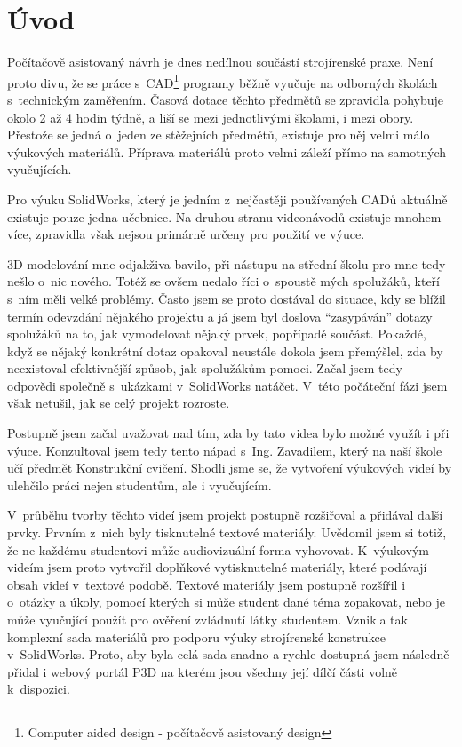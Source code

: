 \chapter*{Úvod}
Počítačově asistovaný návrh je dnes nedílnou součástí strojírenské praxe.
Není proto divu, že se práce s~CAD\footnote{Computer aided design - počítačově asistovaný design} programy běžně vyučuje na odborných školách s~technickým zaměřením.
Časová dotace těchto předmětů se zpravidla pohybuje okolo 2 až 4 hodin týdně, a liší se mezi jednotlivými školami, i mezi obory.
Přestože se jedná o~jeden ze stěžejních předmětů, existuje pro něj velmi málo výukových materiálů.
Příprava materiálů proto velmi záleží přímo na samotných vyučujících.

Pro výuku SolidWorks, který je jedním z~nejčastěji používaných CADů aktuálně existuje pouze jedna učebnice.
Na druhou stranu videonávodů existuje mnohem více, zpravidla však nejsou primárně určeny pro použití ve výuce.

3D modelování mne odjakživa bavilo, při nástupu na střední školu pro mne tedy nešlo o~nic nového.
Totéž se ovšem nedalo říci o~spoustě mých spolužáků, kteří s~ním měli velké problémy.
Často jsem se proto dostával do situace, kdy se blížil termín odevzdání nějakého projektu a já jsem byl doslova \enquote{zasypáván} dotazy spolužáků na to, jak vymodelovat nějaký prvek, popřípadě součást.
Pokaždé, když se nějaký konkrétní dotaz opakoval neustále dokola jsem přemýšlel, zda by neexistoval efektivnější způsob, jak spolužákům pomoci.
Začal jsem tedy odpovědi společně s~ukázkami v~SolidWorks natáčet.
V~této počáteční fázi jsem však netušil, jak se celý projekt rozroste.

Postupně jsem začal uvažovat nad tím, zda by tato videa bylo možné využít i při výuce.
Konzultoval jsem tedy tento nápad s~Ing. Zavadilem, který na naší škole učí předmět Konstrukční cvičení.
Shodli jsme se, že vytvoření výukových videí by ulehčilo práci nejen studentům, ale i vyučujícím.

V~průběhu tvorby těchto videí jsem projekt postupně rozšiřoval a přidával další prvky.
Prvním z~nich byly tisknutelné textové materiály.
Uvědomil jsem si totiž, že ne každému studentovi může audiovizuální forma vyhovovat.
K~výukovým videím jsem proto vytvořil doplňkové vytisknutelné materiály, které podávají obsah videí v~textové podobě.
Textové materiály jsem postupně rozšířil i o~otázky a úkoly, pomocí kterých si může student dané téma zopakovat, nebo je může vyučující použít pro ověření zvládnutí látky studentem.
Vznikla tak komplexní sada materiálů pro podporu výuky strojírenské konstrukce v~SolidWorks.
Proto, aby byla celá sada snadno a rychle dostupná jsem následně přidal i webový portál P3D na kterém jsou všechny její dílčí části volně k~dispozici.

